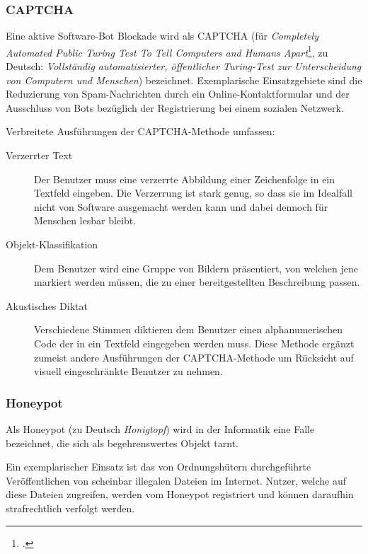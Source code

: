 \subsubsection{CAPTCHA}
\label{ssub:captcha}

Eine aktive Software-Bot Blockade wird als CAPTCHA (für \emph{Completely
Automated Public Turing Test To Tell Computers and Humans
Apart}\footcite{captchaNet}, zu Deutsch: \emph{Vollständig automatisierter,
öffentlicher Turing-Test zur Unterscheidung von Computern und Menschen})
bezeichnet. Exemplarische Einsatzgebiete sind die Reduzierung von
Spam-Nachrichten durch ein Online-Kontaktformular und der Ausschluss von Bots
bezüglich der Registrierung bei einem sozialen Netzwerk.

Verbreitete Ausführungen der CAPTCHA-Methode umfassen:

\begin{description}
  \item[Verzerrter Text]
  Der Benutzer muss eine verzerrte Abbildung einer Zeichenfolge in ein Textfeld
  eingeben. Die Verzerrung ist stark genug, so dass sie im Idealfall nicht von
  Software ausgemacht werden kann und dabei dennoch für Menschen lesbar bleibt.
  
  \item[Objekt-Klassifikation]
  Dem Benutzer wird eine Gruppe von Bildern präsentiert, von welchen jene
  markiert werden müssen, die zu einer bereitgestellten Beschreibung passen.
  
  \item[Akustisches Diktat]
  Verschiedene Stimmen diktieren dem Benutzer einen alphanumerischen Code der
  in ein Textfeld eingegeben werden muss. Diese Methode ergänzt zumeist andere
  Ausführungen der CAPTCHA-Methode um Rücksicht auf visuell eingeschränkte
  Benutzer zu nehmen.
\end{description}

\subsubsection{Honeypot}
\label{ssub:honeypot}

Als Honeypot (zu Deutsch \emph{Honigtopf}) wird in der Informatik eine Falle
bezeichnet, die sich als begehrenswertes Objekt tarnt.

Ein exemplarischer Einsatz ist das von Ordnungshütern durchgeführte
Veröffentlichen von scheinbar illegalen Dateien im Internet. Nutzer, welche auf
diese Dateien zugreifen, werden vom Honeypot registriert und können daraufhin
strafrechtlich verfolgt werden.

